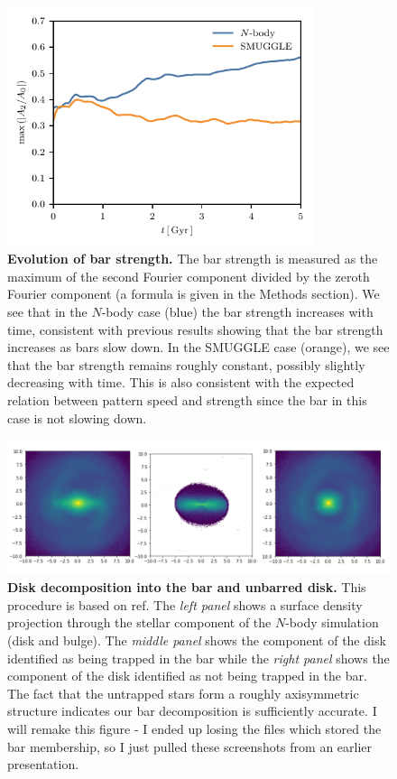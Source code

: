 \documentclass{natureprintstyle}
\newcommand{\Nbody}{$N$-body}
\begin{document}
\begin{figure}[t!]%
\centering
\includegraphics[width=9cm]{fig/fig-A2.pdf}
\caption{\textbf{Evolution of bar strength.} The bar strength is measured as
the maximum of the second Fourier component divided by the zeroth Fourier
component (a formula is given in the Methods section). We see that in the
\Nbody{} case (blue) the bar strength increases with time, consistent with
previous results showing that the bar strength increases as bars slow down. In
the SMUGGLE case (orange), we see that the bar strength remains roughly
constant, possibly slightly decreasing with time. This is also consistent with
the expected relation between pattern speed and strength since the bar in this
case is not slowing down.}
\label{fig:strength}
\end{figure}

\begin{figure}[t!]%
\centering
\includegraphics[width=18cm]{fig/fig-bar_decomp.pdf}
\caption{\textbf{Disk decomposition into the bar and unbarred disk.} This
procedure is based on ref.\cite{2016MNRAS.463.1952P} The \textit{left panel}
shows a surface density projection through the stellar component of the
\Nbody{} simulation (disk and bulge). The \textit{middle panel} shows the
component of the disk identified as being trapped in the bar while the
\textit{right panel} shows the component of the disk identified as not being
trapped in the bar. The fact that the untrapped stars form a roughly
axisymmetric structure indicates our bar decomposition is sufficiently
accurate. {\color{red} I will remake this figure
- I ended up losing the files which stored the bar membership, so I just
pulled these screenshots from an earlier presentation.}}
\label{fig:decomp}
\end{figure}
\end{document}
